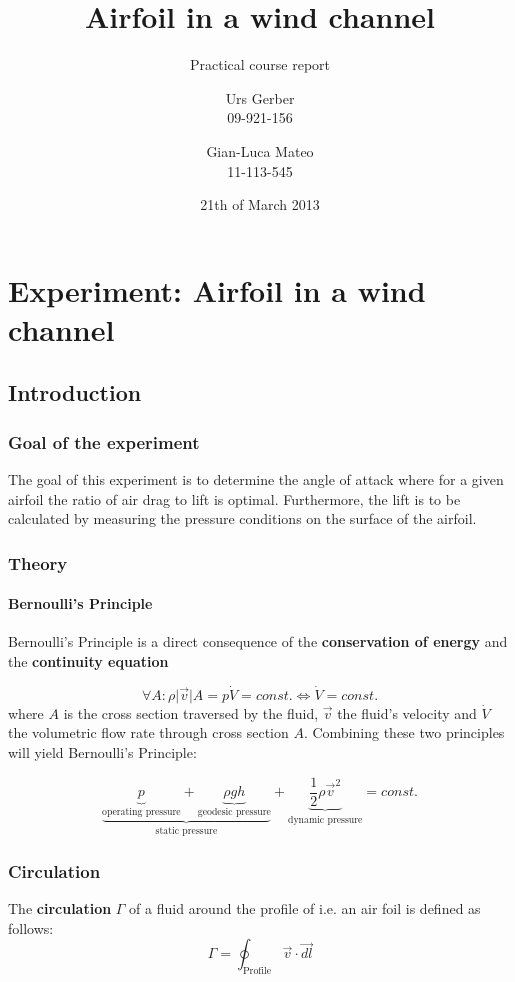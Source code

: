 \documentclass{scrreprt}
\author{Urs Gerber\\09-921-156 \and Gian-Luca Mateo\\11-113-545}
\date{21th of March 2013}
\title{Airfoil in a wind channel}
\subtitle{Practical course report}
\begin{document}
\maketitle

\tableofcontents
\newpage

\chapter{Experiment: Airfoil in a wind channel}
\section{Introduction}
\subsection{Goal of the experiment}
The goal of this experiment is to determine the angle of attack where for a given airfoil the ratio of air drag to lift is optimal. Furthermore, the lift is to be calculated by measuring the pressure conditions on the surface of the airfoil.

\subsection{Theory}

\subsubsection{Bernoulli's Principle}
Bernoulli's Principle is a direct consequence of the \textbf{conservation of energy} and the \textbf{continuity equation}

\begin{equation}
\forall A : \rho \lvert \vec{v}\rvert A = p \dot{V} = const. \Longleftrightarrow \dot{V} = const.
\end{equation}
where $A$ is the cross section traversed by the fluid, $\vec{v}$ the fluid's velocity and $\dot{V}$ the volumetric flow rate through cross section $A$. Combining these two principles will yield Bernoulli's Principle:

\begin{equation}
\underbrace{\underbrace{p}_{\text{operating pressure}} + \underbrace{\rho g h}_{\text{geodesic pressure}}}_{\text{static pressure}} + \underbrace{\frac{1}{2} \rho \vec{v}^2}_{\text{dynamic pressure}} = const.
\end{equation}

\subsection{Circulation}
The \textbf{circulation} $\Gamma$ of a fluid around the profile of i.e. an air foil is defined as follows:
\begin{equation}
\Gamma = \oint_{\text{Profile}}\vec{v}\cdot\vec{dl}
\end{equation}
\end{document}
